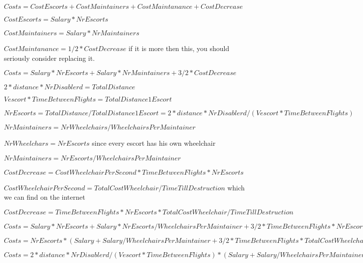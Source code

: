 \documentclass[a4paper, 12pt, notitlepage]{report}
\begin{document}
\begin{description}
	\item $Costs = CostEscorts + CostMaintainers + CostMaintanance + CostDecrease$
	\item $CostEscorts = Salary * NrEscorts$
	\item $CostMaintainers = Salary * NrMaintainers$
	\item $CostMaintanance = 1/2 * CostDecrease $ if it is more then this, you should seriously consider replacing it.
	\item 
	\item $Costs = Salary * NrEscorts + Salary * NrMaintainers + 3/2* CostDecrease$
	\item $2*distance*NrDisablerd= TotalDistance$
	\item $Vescort*TimeBetweenFlights = TotalDistance1Escort $
	\item $NrEscorts = TotalDistance/TotalDistance1Escort = 2*distance*NrDisablerd/(Vescort*TimeBetweenFlights)$
	\item 
	\item $NrMaintainers = NrWheelchairs/WheelchairsPerMaintainer$
	\item $NrWheelchars = NrEscorts$ since every escort has his own wheelchair
	\item $NrMaintainers = NrEscorts/WheelchairsPerMaintainer$
	\item 
	\item $CostDecrease  = CostWheelchairPerSecond * TimeBetweenFlights * NrEscorts$
	\item $CostWheelchairPerSecond = TotalCostWheelchair/TimeTillDestruction$ which we can find on the internet
	\item $CostDecrease  = TimeBetweenFlights * NrEscorts * TotalCostWheelchair/TimeTillDestruction$
	\item 
	\item $Costs = Salary * NrEscorts + Salary * NrEscorts/WheelchairsPerMaintainer + 3/2* TimeBetweenFlights * NrEscorts * TotalCostWheelchair/TimeTillDestruction$
	\item $Costs = NrEscorts * (Salary + Salary/WheelchairsPerMaintainer + 3/2* TimeBetweenFlights * TotalCostWheelchair/TimeTillDestruction)$
	\item $Costs = 2*distance*NrDisablerd/(Vescort*TimeBetweenFlights) * (Salary + Salary/WheelchairsPerMaintainer + 3/2* TimeBetweenFlights * TotalCostWheelchair/TimeTillDestruction)$
	\item   
\end{description}
\end{document}
